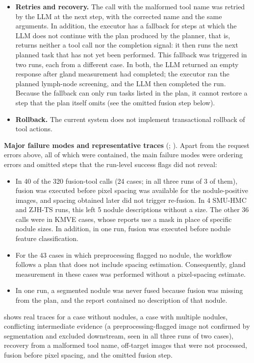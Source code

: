 \begin{itemize}[leftmargin=1.5em,itemsep=1pt,topsep=2pt]
\item \textbf{Retries and recovery.} The call with the malformed tool name was retried by the LLM at the next step, with the corrected name and the same arguments. In addition, the executor has a fallback for steps at which the LLM does not continue with the plan produced by the planner, that is, returns neither a tool call nor the completion signal: it then runs the next planned task that has not yet been performed. This fallback was triggered in two runs, each from a different case. In both, the LLM returned an empty response after gland measurement had completed; the executor ran the planned lymph-node screening, and the LLM then completed the run. Because the fallback can only run tasks listed in the plan, it cannot restore a step that the plan itself omits (see the omitted fusion step below).
\item \textbf{Rollback.} The current system does not implement transactional rollback of tool actions.
\end{itemize}

\textbf{Major failure modes and representative traces} (; ). Apart from the request errors above, all of which were contained, the main failure modes were ordering errors and omitted steps that the run-level success flags did not reveal:\par

\begin{itemize}[leftmargin=1.5em,itemsep=1pt,topsep=2pt]
\item In 40 of the 320 fusion-tool calls (24 cases; in all three runs of 3 of them), fusion was executed before pixel spacing was available for the nodule-positive images, and spacing obtained later did not trigger re-fusion. In 4 SMU-HMC and ZJH-TS runs, this left 5 nodule descriptions without a size. The other 36 calls were in KMVE cases, whose reports use a mask in place of specific nodule sizes. In addition, in one run, fusion was executed before nodule feature classification.
\item For the 43 cases in which preprocessing flagged no nodule, the workflow follows a plan that does not include spacing estimation. Consequently, gland measurement in these cases was performed without a pixel-spacing estimate.
\item In one run, a segmented nodule was never fused because fusion was missing from the plan, and the report contained no description of that nodule.
\end{itemize}

 shows real traces for a case without nodules, a case with multiple nodules, conflicting intermediate evidence (a preprocessing-flagged image not confirmed by segmentation and excluded downstream, seen in all three runs of two cases), recovery from a malformed tool name, off-target images that were not processed, fusion before pixel spacing, and the omitted fusion step.\par
